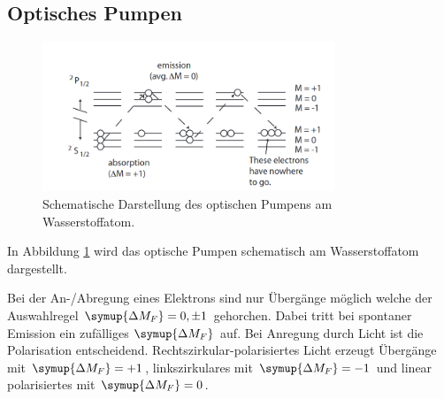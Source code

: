 \subsection{Optisches Pumpen}
\begin{figure}
    \centering
    \includegraphics[width = 0.78\textwidth]{pics/pumpen.png}
    \caption{Schematische Darstellung des optischen Pumpens am Wasserstoffatom.\cite{Optisches pumpen}}
    \label{pic:pump}
\end{figure}
In Abbildung \ref{pic:pump} wird das optische Pumpen schematisch am Wasserstoffatom dargestellt.

Bei der An-/Abregung eines Elektrons sind nur Übergänge möglich welche der Auswahlregel $\symup{\Delta{M_F}} = 0, \pm 1$ gehorchen.
Dabei tritt bei spontaner Emission ein zufälliges $\symup{\Delta{M_F}}$ auf. Bei Anregung durch Licht ist die Polarisation entscheidend.
Rechtszirkular-polarisiertes Licht erzeugt Übergänge mit $\symup{\Delta{M_F}} = +1$, linkszirkulares mit $\symup{\Delta{M_F}} = -1$ und linear polarisiertes
mit $\symup{\Delta{M_F}} = 0$.

